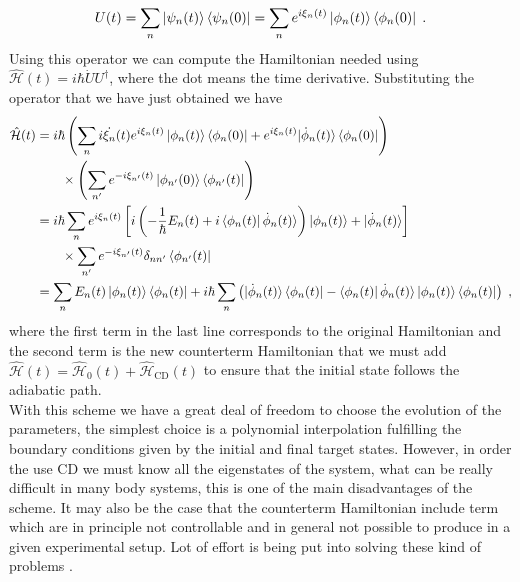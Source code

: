 \begin{equation}
	U(t)=\sum_n\ket{\psi_n(t)}\bra{\psi_n(0)}=\sum_ne^{i\xi_n(t)}\ket{\phi_n(t)}\bra{\phi_n(0)}\; .
\end{equation}
Using this operator we can compute the Hamiltonian needed using $\hat{\mathcal{H}}(t)=i\hbar \dot{U}U^\dag$,  where the dot means the time derivative. Substituting the operator that we have just obtained we have
\begin{equation}
	\begin{split}
	\hat{\mathcal{H}}(t)&=i\hbar\left(\sum_ni\dot{\xi_n}(t)e^{i\xi_n(t)}\ket{\phi_n(t)}\bra{\phi_n(0)}+e^{i\xi_n(t)}|\dot{\phi}_n(t)\rangle\bra{\phi_n(0)}\right)\\
	&\phantom{=i\hbar}\times\left(\sum_{n'}e^{-i\xi_{n'}(t)}\ket{\phi_{n'}(0)}\bra{\phi_{n'}(t)}\right)\\
	&=i\hbar\sum_ne^{i\xi_n(t)}\left[i\left(-\frac{1}{\hbar}E_n(t)+i\bra{\phi_n(t)}\dot{\phi}_n(t)\rangle\right)\ket{\phi_n(t)}+|\dot{\phi}_n(t)\rangle\right]\\
	&\phantom{=i\hbar}\times\sum_{n'}e^{-i\xi_{n'}(t)}\delta_{nn'}\bra{\phi_{n'}(t)}\\
	&=\sum_nE_n(t)\ket{\phi_n(t)}\bra{\phi_n(t)}+i\hbar\sum_n\left(|\dot{\phi}_n(t)\rangle\bra{\phi_n(t)}-\bra{\phi_n(t)}\dot{\phi}_n(t)\rangle\ket{\phi_n(t)}\bra{\phi_n(t)}\right)\; ,
	\end{split}
\end{equation}
where the first term in the last line corresponds to the original Hamiltonian and the second term is the new counterterm Hamiltonian that we must add $\hat{\mathcal{H}}(t)=\hat{\mathcal{H}}_0(t)+\hat{\mathcal{H}}_{\text{CD}}(t)$ to ensure that the initial state follows the adiabatic path.\\

With this scheme we have a great deal of freedom to choose the evolution of the parameters, the simplest choice is a polynomial interpolation fulfilling the boundary conditions given by the initial and final target states. However, in order the use CD we must know all the eigenstates of the system, what can be really difficult in many body systems, this is one of the main disadvantages of the scheme. It may also be the case that the counterterm Hamiltonian include term which are in principle not controllable and in general not possible to produce in a given experimental setup. Lot of effort is being put into solving these kind of problems \cite{Ibanez2011,Chen2017,Petiziol2018,Baksic2016}.

